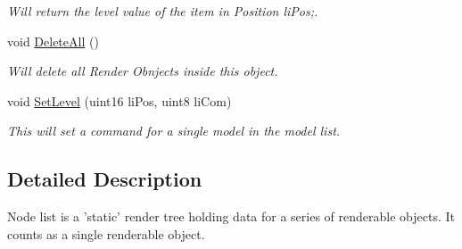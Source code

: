 \begin{DoxyCompactItemize}
\begin{DoxyCompactList}\small\item\em Will return the level value of the item in Position liPos;. \end{DoxyCompactList}\item 
\hypertarget{classc_node_list_ab5325c93dfc452012453d9294b353ac0}{
void \hyperlink{classc_node_list_ab5325c93dfc452012453d9294b353ac0}{DeleteAll} ()}
\label{classc_node_list_ab5325c93dfc452012453d9294b353ac0}

\begin{DoxyCompactList}\small\item\em Will delete all Render Obnjects inside this object. \end{DoxyCompactList}\item 
void \hyperlink{classc_node_list_a774fe1fa393c33b598b985449525d97c}{SetLevel} (uint16 liPos, uint8 liCom)
\begin{DoxyCompactList}\small\item\em This will set a command for a single model in the model list. \end{DoxyCompactList}\end{DoxyCompactItemize}


\subsection{Detailed Description}
Node list is a 'static' render tree holding data for a series of renderable objects. It counts as a single renderable object. 


